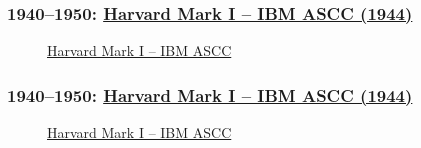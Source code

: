 \documentclass[ignorenonframetext, hyperref=unicode]{beamer}
\begin{document}
\begin{frame}
\frametitle{1940--1950: 
\href{http://en.wikipedia.org/wiki/Harvard_Mark_I}{Harvard Mark I – IBM ASCC (1944)}}
\begin{figure}[h]
\center
{}
\caption{\href{http://en.wikipedia.org/wiki/Image:Harvard_Mark_I_Computer_-_Left_Segment.jpg}{Harvard Mark I
-- IBM ASCC}}
\end{figure}
\end{frame}

\begin{frame}
\frametitle{1940--1950: 
\href{http://en.wikipedia.org/wiki/Harvard_Mark_I}{Harvard Mark I – IBM ASCC (1944)}}
\begin{figure}[h]
\center
{}
\caption{\href{http://en.wikipedia.org/wiki/Image:Harvard_Mark_I_Computer_-_Input-Output_Details.jpg}{Harvard Mark I
-- IBM ASCC}}
\end{figure}
\end{frame}
\end{document}
